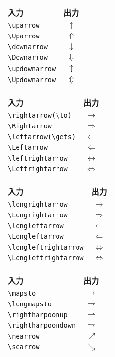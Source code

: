 \documentclass[class=jreport, crop=false, preview=false, dvipdfmx, fleqn]{standalone}
\begin{document}
\begin{tabular}{lc}
入力 & 出力 \\ \hline
\verb|\uparrow| & $\uparrow$ \\
\verb|\Uparrow| & $\Uparrow$ \\
\verb|\downarrow| & $\downarrow$ \\
\verb|\Downarrow| & $\Downarrow$ \\
\verb|\updownarrow| & $\updownarrow$ \\
\verb|\Updownarrow| & $\Updownarrow$ \\
\end{tabular}
\begin{tabular}{lc}
入力 & 出力 \\ \hline
\verb|\rightarrow(\to)| & $\rightarrow$ \\
\verb|\Rightarrow| & $\Rightarrow$ \\
\verb|\leftarrow(\gets)| & $\leftarrow$ \\
\verb|\Leftarrow| & $\Leftarrow$ \\
\verb|\leftrightarrow| & $\leftrightarrow$ \\
\verb|\Leftrightarrow| & $\Leftrightarrow$ \\
\end{tabular}

\begin{tabular}{lc}
入力 & 出力 \\ \hline
\verb|\longrightarrow| & $\longrightarrow$ \\
\verb|\Longrightarrow| & $\Longrightarrow$ \\
\verb|\longleftarrow| & $\longleftarrow$ \\
\verb|\Longleftarrow| & $\Longleftarrow$ \\
\verb|\longleftrightarrow| & $\Longleftrightarrow$ \\
\verb|\Longleftrightarrow| & $\Longleftrightarrow$ \\
\end{tabular}
\begin{tabular}{lc}
入力 & 出力 \\ \hline
\verb|\mapsto| & $\mapsto$ \\
\verb|\longmapsto| & $\longmapsto$ \\
\verb|\rightharpoonup| & $\rightharpoonup$ \\
\verb|\rightharpoondown| & $\rightharpoondown$ \\
\verb|\nearrow| & $\nearrow$ \\
\verb|\searrow| & $\searrow$ \\
\end{tabular}
\end{document}
